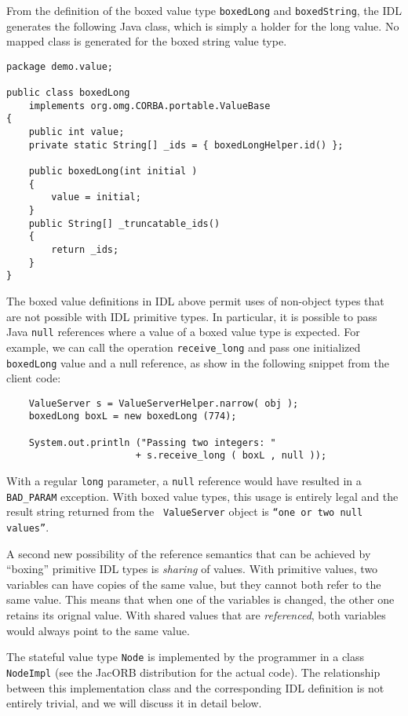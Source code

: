 From the definition of the  boxed value type {\tt boxedLong} and
{\tt boxedString}, the IDL generates the following Java class, which
is simply a holder for the long value. No mapped class is generated
for the boxed string value type.

\begin{verbatim}
package demo.value;

public class boxedLong
    implements org.omg.CORBA.portable.ValueBase
{
    public int value;
    private static String[] _ids = { boxedLongHelper.id() };

    public boxedLong(int initial )
    {
        value = initial;
    }
    public String[] _truncatable_ids()
    {
        return _ids;
    }
}
\end{verbatim}

The boxed value definitions in IDL above permit uses of non-object
types that are not possible with IDL primitive types. In particular, it
is possible to pass Java {\tt null} references where a value of a
boxed value type is expected. For example, we can call the operation
{\tt receive\_long} and pass one initialized {\tt boxedLong} value and
a null reference, as show in the following snippet from the client
code:

\begin{verbatim}
    ValueServer s = ValueServerHelper.narrow( obj );
    boxedLong boxL = new boxedLong (774);

    System.out.println ("Passing two integers: "
                       + s.receive_long ( boxL , null ));
\end{verbatim}

With a regular {\tt long} parameter, a {\tt null} reference would have
resulted in a {\tt BAD\_PARAM} exception. With boxed value types, this
usage is entirely legal and the result string returned from the {\tt
  ValueServer} object is {\tt ``one or two null values''}.

A second new possibility of the reference semantics that can be
achieved by ``boxing'' primitive IDL types is {\em sharing} of values.
With primitive values, two variables can have copies of the same
value, but they cannot both refer to the same value. This means that
when one of the variables is changed, the other one retains its
orignal value. With shared values that are {\em referenced}, both
variables would always point to the same value.

The stateful value type {\tt Node} is implemented by the programmer in
a class {\tt NodeImpl} (see the JacORB distribution for the actual
code).  The relationship between this implementation class and the
corresponding IDL definition is not entirely trivial, and we will
discuss it in detail below.

